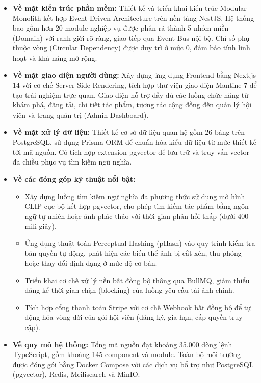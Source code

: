 \begin{itemize}
    \item \textbf{Về mặt kiến trúc phần mềm:} Thiết kế và triển khai kiến trúc Modular Monolith kết hợp Event-Driven Architecture trên nền tảng NestJS. Hệ thống bao gồm hơn 20 module nghiệp vụ được phân rã thành 5 nhóm miền (Domain) với ranh giới rõ ràng, giao tiếp qua Event Bus nội bộ. Chỉ số phụ thuộc vòng (Circular Dependency) được duy trì ở mức 0, đảm bảo tính linh hoạt và khả năng mở rộng.

    \item \textbf{Về mặt giao diện người dùng:} Xây dựng ứng dụng Frontend bằng Next.js 14 với cơ chế Server-Side Rendering, tích hợp thư viện giao diện Mantine 7 để tạo trải nghiệm trực quan. Giao diện hỗ trợ đầy đủ các luồng chức năng từ khám phá, đăng tải, chi tiết tác phẩm, tương tác cộng đồng đến quản lý hội viên và trang quản trị (Admin Dashboard).

    \item \textbf{Về mặt xử lý dữ liệu:} Thiết kế cơ sở dữ liệu quan hệ gồm 26 bảng trên PostgreSQL, sử dụng Prisma ORM để chuẩn hóa kiểu dữ liệu từ mức thiết kế tới mã nguồn. Có tích hợp extension pgvector để lưu trữ và truy vấn vector đa chiều phục vụ tìm kiếm ngữ nghĩa.

    \item \textbf{Về các đóng góp kỹ thuật nổi bật:}
    \begin{itemize}
        \item Xây dựng luồng tìm kiếm ngữ nghĩa đa phương thức sử dụng mô hình CLIP cục bộ kết hợp pgvector, cho phép tìm kiếm tác phẩm bằng ngôn ngữ tự nhiên hoặc ảnh phác thảo với thời gian phản hồi thấp (dưới 400 mili giây).
        \item Ứng dụng thuật toán Perceptual Hashing (pHash) vào quy trình kiểm tra bản quyền tự động, phát hiện các biến thể ảnh bị cắt xén, thu phóng hoặc thay đổi định dạng ở mức độ cơ bản.
        \item Triển khai cơ chế xử lý nền bất đồng bộ thông qua BullMQ, giảm thiểu đáng kể thời gian chặn (blocking) của luồng yêu cầu tải ảnh chính.
        \item Tích hợp cổng thanh toán Stripe với cơ chế Webhook bất đồng bộ để tự động hóa vòng đời của gói hội viên (đăng ký, gia hạn, cấp quyền truy cập).
    \end{itemize}

    \item \textbf{Về quy mô hệ thống:} Tổng mã nguồn đạt khoảng 35.000 dòng lệnh TypeScript, gồm khoảng 145 component và module. Toàn bộ môi trường được đóng gói bằng Docker Compose với các dịch vụ bổ trợ như PostgreSQL (pgvector), Redis, Meilisearch và MinIO.
\end{itemize}

